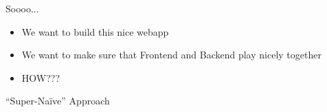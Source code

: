 \begin{frame}[fragile]{Soooo...}

\begin{itemize}

\item We want to build this nice webapp

\item We want to make sure that Frontend and Backend play nicely together

\item HOW???

\end{itemize}

\end{frame}

\begin{frame}[fragile]{}

\begin{center}
{\Huge
``Super-Na\"ive'' Approach
}
\end{center}

\end{frame}

